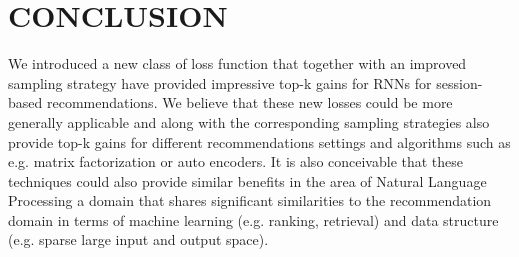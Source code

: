 \label{headings}


\section{CONCLUSION}
We introduced a new class of loss function that together with an improved sampling strategy have provided impressive top-k gains for RNNs for session-based recommendations. We believe that these new losses could be more generally applicable and along with the corresponding sampling strategies also provide top-k gains for different recommendations settings and algorithms such as e.g. matrix factorization or auto encoders. It is also conceivable that these techniques could also provide similar benefits in the area of Natural Language Processing a domain that shares significant similarities to the recommendation domain in terms of machine learning (e.g. ranking, retrieval) and data structure (e.g. sparse large input and output space).

